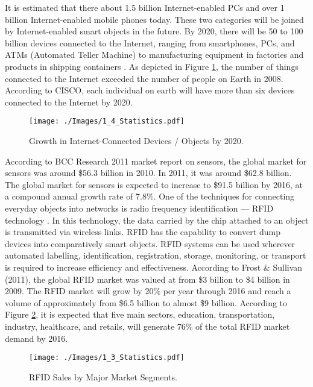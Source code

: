 \documentclass[journal]{IEEEtran}
\begin{document}
It is estimated that there about 1.5 billion Internet-enabled PCs and over 1 billion Internet-enabled  mobile phones  today. These two categories  will  be joined by Internet-enabled smart objects \cite{P041, TII07}  in the future. By 2020, there will  be 50 to 100 billion devices connected to the Internet, ranging from smartphones, PCs, and ATMs (Automated Teller Machine) to manufacturing equipment in factories and products in shipping containers  \cite{ZMP008}. As depicted in Figure \ref{Figure:Statistics3}, the number of things connected to the Internet exceeded the number of people on Earth in 2008. According to CISCO, each individual on earth will have more than six devices connected to the Internet by 2020.



\begin{figure}[!h]
 \centering
\texttt{[image: ./Images/1\_4\_Statistics.pdf]}
\caption{Growth in Internet-Connected Devices / Objects by 2020.}
\label{Figure:Statistics3}	
\end{figure}






According to BCC Research 2011 market report on sensors, the global market for sensors was around \$56.3 billion in 2010. In 2011, it was around \$62.8 billion. The global market for sensors is expected to increase to \$91.5 billion by 2016, at a compound annual growth rate of 7.8\%. One of the techniques for connecting everyday objects into networks is radio frequency identification — RFID technology \cite{Z1044}. In this technology, the data carried by the chip attached to an object is transmitted via wireless links. RFID has the capability to convert dump devices into comparatively smart objects. RFID systems can be used wherever automated labelling, identification, registration, storage, monitoring, or transport is required to increase efficiency and effectiveness. According to Frost \& Sullivan (2011), the global RFID market was valued at from \$3 billion to \$4 billion in 2009. The RFID market will grow by 20\% per year through 2016 and reach a volume of approximately from \$6.5 billion to almost \$9 billion. According to Figure \ref{Figure:Statistics2}, it is expected that five main sectors, education, transportation, industry, healthcare, and retails, will generate 76\% of the total RFID market demand by 2016. 


\begin{figure}[!h]
 \centering
\texttt{[image: ./Images/1\_3\_Statistics.pdf]}
\caption{RFID Sales by Major Market Segments.}
\label{Figure:Statistics2}	
\end{figure}
\end{document}

